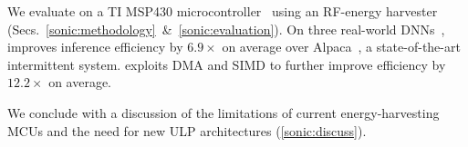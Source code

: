 \noindent
We evaluate \sonictails on a TI MSP430
microcontroller~\cite{msp430fr5994} using an RF-energy
harvester~\cite{powercastboard,powercasttransmitter} (Secs.~\autoref{sonic:methodology}~\&~\autoref{sonic:evaluation}).
%
On three real-world DNNs~\cite{lecun:ieee89:lenet,okgoogle,har},
\sonic improves inference efficiency by $6.9\times$ on average
over Alpaca~\cite{alpaca}, a state-of-the-art intermittent system.
%
\tails exploits DMA and SIMD to further improve efficiency by $12.2\times$ on average.

We conclude with a discussion of the limitations of current energy-harvesting MCUs and the need for new ULP architectures (\autoref{sonic:discuss}).


